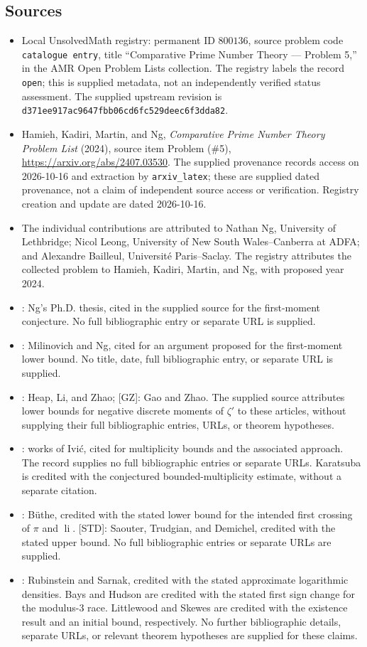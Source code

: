 \documentclass[11pt]{article}
\begin{document}
\subsection{Sources}
\begin{itemize}
\item Local UnsolvedMath registry: permanent ID \(800136\), source problem code \texttt{catalogue entry}, title ``Comparative Prime Number Theory --- Problem 5,'' in the AMR Open Problem Lists collection. The registry labels the record \texttt{open}; this is supplied metadata, not an independently verified status assessment. The supplied upstream revision is \texttt{d371ee917ac9647fbb06cd6fc529deec6f3dda82}.
\item Hamieh, Kadiri, Martin, and Ng, \emph{Comparative Prime Number Theory Problem List} (2024), source item Problem (\#5), \url{https://arxiv.org/abs/2407.03530}. The supplied provenance records access on 2026-10-16 and extraction by \texttt{arxiv\_latex}; these are supplied dated provenance, not a claim of independent source access or verification. Registry creation and update are dated 2026-10-16.
\item The individual contributions are attributed to Nathan Ng, University of Lethbridge; Nicol Leong, University of New South Wales--Canberra at ADFA; and Alexandre Bailleul, Universit\'e Paris--Saclay. The registry attributes the collected problem to Hamieh, Kadiri, Martin, and Ng, with proposed year 2024.
\item [NgPhd]: Ng's Ph.D. thesis, cited in the supplied source for the first-moment conjecture. No full bibliographic entry or separate URL is supplied.
\item [MN]: Milinovich and Ng, cited for an argument proposed for the first-moment lower bound. No title, date, full bibliographic entry, or separate URL is supplied.
\item [HLZ]: Heap, Li, and Zhao; [GZ]: Gao and Zhao. The supplied source attributes lower bounds for negative discrete moments of \(\zeta'\) to these articles, without supplying their full bibliographic entries, URLs, or theorem hypotheses.
\item [Ivic1, Ivic2]: works of Ivi\'c, cited for multiplicity bounds and the associated approach. The record supplies no full bibliographic entries or separate URLs. Karatsuba is credited with the conjectured bounded-multiplicity estimate, without a separate citation.
\item [Buthe0]: B\"uthe, credited with the stated lower bound for the intended first crossing of \(\pi\) and \(\operatorname{li}\). [STD]: Saouter, Trudgian, and Demichel, credited with the stated upper bound. No full bibliographic entries or separate URLs are supplied.
\item [RS]: Rubinstein and Sarnak, credited with the stated approximate logarithmic densities. Bays and Hudson are credited with the stated first sign change for the modulus-\(3\) race. Littlewood and Skewes are credited with the existence result and an initial bound, respectively. No further bibliographic details, separate URLs, or relevant theorem hypotheses are supplied for these claims.
\end{itemize}
\end{document}
